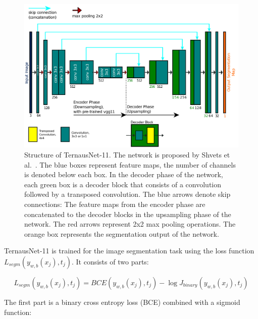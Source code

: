 
\begin{figure}
	\centering
	\includegraphics[width=.9\textwidth]{images/networks/TernausNet11_description.png}
	\caption[Structure of TernausNet-11]{Structure of TernausNet-11. The network is proposed by Shvets et al.~\cite{Shvets2018}. 
The blue boxes represent feature maps, the number of channels is denoted below each box. In the decoder phase of the network, each green box is a decoder block that consists of a convolution followed by a transposed convolution. 
The blue arrows denote skip connections:
The feature maps from the encoder phase are concatenated to the decoder blocks in the upsampling phase of the network. 
The red arrows represent 2x2 max pooling operations. The orange box represents the segmentation output of the network.
	}
	\label{img:ternausnet_11}
\end{figure}

TernausNet-11 is trained for the image segmentation task using the loss function $L_{segm}(y_{w,b}(x_j),t_j)$. It consists of two parts:

\begin{equation}
\label{eq:loss_segmentation}
L_{segm}(y_{w,b}(x_j),t_j) = BCE(y_{w,b}(x_j),t_j) - \log J_{binary}(y_{w,b}(x_j),t_j)
\end{equation}

The first part is a binary cross entropy loss (BCE) combined with a sigmoid function:


